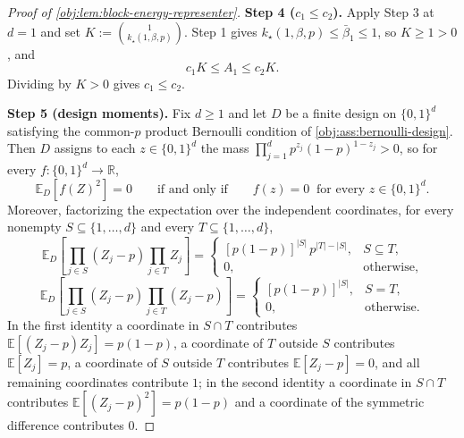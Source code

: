 \documentclass[11pt]{article}
\begin{document}
\begin{proof}[Proof of \cref{obj:lem:block-energy-representer}]
\textbf{Step 4 (\(c_1\le c_2\)).}
Apply Step 3 at \(d=1\) and set \(K:=\binom{1}{k_\star(1,\beta,p)}\).  Step 1 gives \(k_\star(1,\beta,p)\le\bar\beta_1\le1\), so \(K\ge1>0\), and
\[
c_1K\le A_1\le c_2K .
\]
Dividing by \(K>0\) gives \(c_1\le c_2\). %

\textbf{Step 5 (design moments).}
Fix \(d\ge1\) and let \(D\) be a finite design on \(\{0,1\}^d\) satisfying the common-\(p\) product Bernoulli condition of \cref{obj:ass:bernoulli-design}.  Then \(D\) assigns to each \(z\in\{0,1\}^d\) the mass \(\prod_{j=1}^d p^{z_j}(1-p)^{1-z_j}>0\), so for every \(f:\{0,1\}^d\to\mathbb R\),
\[
\mathbb E_D[f(Z)^2]=0
\qquad\text{if and only if}\qquad
f(z)=0\ \text{ for every } z\in\{0,1\}^d .
\]
Moreover, factorizing the expectation over the independent coordinates, for every nonempty \(S\subseteq\{1,\ldots,d\}\) and every \(T\subseteq\{1,\ldots,d\}\),
\[
\mathbb E_D\!\left[\prod_{j\in S}(Z_j-p)\prod_{j\in T}Z_j\right]
=
\begin{cases}
[p(1-p)]^{|S|}\,p^{|T|-|S|}, & S\subseteq T,\\
0, & \text{otherwise},
\end{cases}
\]
\[
\mathbb E_D\!\left[\prod_{j\in S}(Z_j-p)\prod_{j\in T}(Z_j-p)\right]
=
\begin{cases}
[p(1-p)]^{|S|}, & S=T,\\
0, & \text{otherwise}.
\end{cases}
\]
In the first identity a coordinate in \(S\cap T\) contributes \(\mathbb E[(Z_j-p)Z_j]=p(1-p)\), a coordinate of \(T\) outside \(S\) contributes \(\mathbb E[Z_j]=p\), a coordinate of \(S\) outside \(T\) contributes \(\mathbb E[Z_j-p]=0\), and all remaining coordinates contribute \(1\); in the second identity a coordinate in \(S\cap T\) contributes \(\mathbb E[(Z_j-p)^2]=p(1-p)\) and a coordinate of the symmetric difference contributes \(0\). %


\end{proof}
\end{document}
